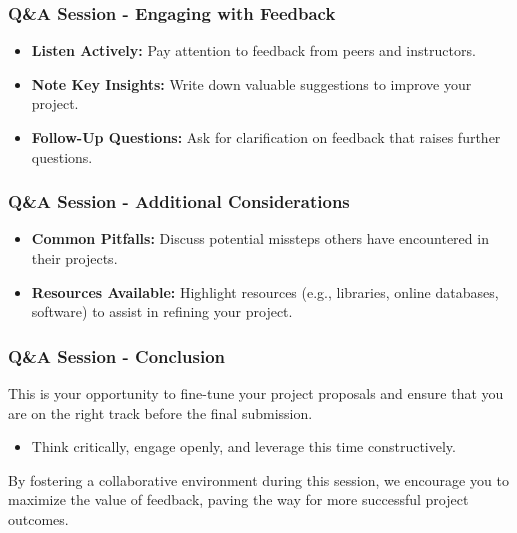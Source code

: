 \documentclass[aspectratio=169]{beamer}
\begin{document}
\begin{frame}[fragile]
    \frametitle{Q\&A Session - Engaging with Feedback}
    \begin{itemize}
        \item \textbf{Listen Actively:} Pay attention to feedback from peers and instructors.
        \item \textbf{Note Key Insights:} Write down valuable suggestions to improve your project.
        \item \textbf{Follow-Up Questions:} Ask for clarification on feedback that raises further questions.
    \end{itemize}
\end{frame}

\begin{frame}[fragile]
    \frametitle{Q\&A Session - Additional Considerations}
    \begin{itemize}
        \item \textbf{Common Pitfalls:} Discuss potential missteps others have encountered in their projects.
        \item \textbf{Resources Available:} Highlight resources (e.g., libraries, online databases, software) to assist in refining your project.
    \end{itemize}
\end{frame}

\begin{frame}[fragile]
    \frametitle{Q\&A Session - Conclusion}
    This is your opportunity to fine-tune your project proposals and ensure that you are on the right track before the final submission. 
    \begin{itemize}
        \item Think critically, engage openly, and leverage this time constructively.
    \end{itemize}
    By fostering a collaborative environment during this session, we encourage you to maximize the value of feedback, paving the way for more successful project outcomes.
\end{frame}
\end{document}
